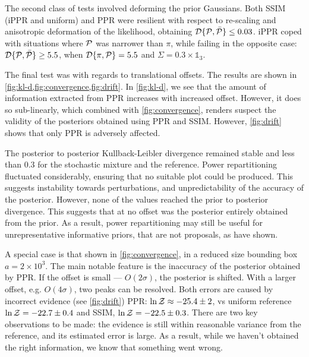 \documentclass[usenatbib]{mnras}
\begin{document}
The second class of tests involved deforming the prior Gaussians.
Both SSIM (iPPR and uniform) and PPR were resilient with respect to
re-scaling and anisotropic deformation of the likelihood, obtaining
${\cal D}\{ {\cal P}, \bar{\cal P}\} \leq 0.03$. iPPR coped with
situations where ${\cal P}$ was narrower than $\pi$, while failing in
the opposite case: ${\cal D}\{ {\cal P}, \bar{\cal P}\} \geq 5.5$,
when ${\cal D}\{ \pi, {\cal P} \} = 5.5$ and
$\Sigma = 0.3 \times \mathds{1}_{3}$.

The final test was with regards to translational offsets. The results
are shown in \cref{fig:kl-d,fig:convergence,fig:drift}. In
\cref{fig:kl-d}, we see that the amount of information extracted from
PPR increases with increased offset. However, it does so sub-linearly,
which combined with \cref{fig:convergence}, renders suspect the
validity of the posteriors obtained using PPR and SSIM. However,
\cref{fig:drift} shows that only PPR is adversely affected.

The posterior to posterior Kullback-Leibler divergence remained stable
and less than \(0.3\) for the stochastic mixture and the
reference. Power repartitioning fluctuated considerably, ensuring that
no suitable plot could be produced. This suggests instability towards
perturbations, and unpredictability of the accuracy of the
posterior. However, none of the values reached the prior to posterior
divergence. This suggests that at no offset was the posterior entirely
obtained from the prior. As a result, power repartitioning may still
be useful for unrepresentative informative priors, that are not
proposals, as \cite{chen-ferroz-hobson} have shown. 

A special case is that shown in \cref{fig:convergence}, in a reduced
size bounding box \(a=2\times 10^{3}\). The main notable feature is
the inaccuracy of the posterior obtained by PPR. If the offset is
small --- \(O(2\sigma)\), the posterior is shifted. With a larger
offset, e.g. \(O(4\sigma)\), two peaks can be resolved.  Both errors
are caused by incorrect evidence (see \cref{fig:drift}) PPR:
\(\ln {\cal Z}\approx -25.4 \pm 2\), vs uniform reference
\(\ln {\cal Z} = -22.7 \pm 0.4\) and SSIM,
\(\ln {\cal Z} = -22.5 \pm 0.3\). There are two key observations to be
made: the evidence is still within reasonable variance from the
reference, and its estimated error is large. As a result, while we
haven't obtained the right information, we know that something went
wrong.
\end{document}
